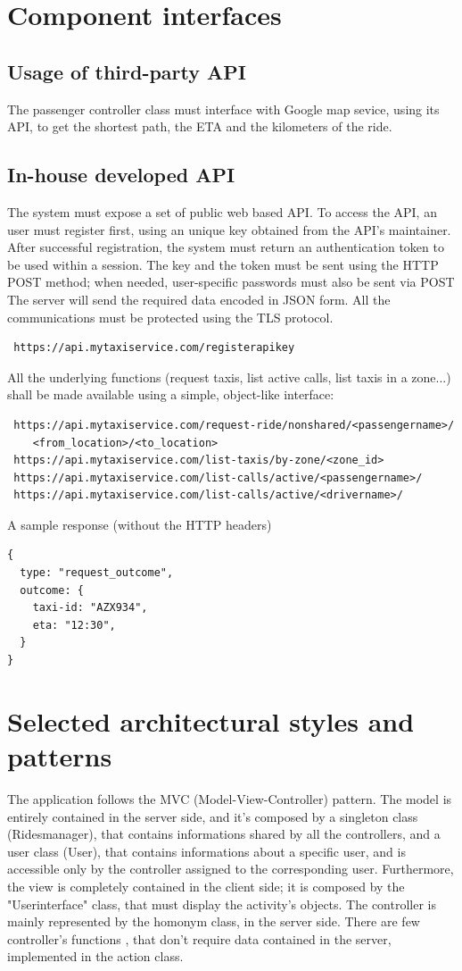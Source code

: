 \section{Component interfaces}

\subsection{Usage of third-party API}
The passenger controller class must interface with Google map sevice, using its API, to get the shortest path, the ETA and the 
kilometers of the ride.

\subsection{In-house developed API}
The system must expose a set of public web based API. To access the API, an user must register first, using an unique key
obtained from the API's maintainer.
After successful registration, the system must return an authentication token to be used within a session.
The key and the token must be sent using the HTTP POST method; when needed, user-specific passwords must also
be sent via POST
The server will send the required data encoded in JSON form.
All the communications must be protected using the TLS protocol.
\begin{verbatim}
 https://api.mytaxiservice.com/registerapikey
\end{verbatim}
All the underlying functions (request taxis, list active calls, list taxis in a zone...) shall be made available using a simple,
object-like interface:
\begin{verbatim}
 https://api.mytaxiservice.com/request-ride/nonshared/<passengername>/
    <from_location>/<to_location>
 https://api.mytaxiservice.com/list-taxis/by-zone/<zone_id>
 https://api.mytaxiservice.com/list-calls/active/<passengername>/
 https://api.mytaxiservice.com/list-calls/active/<drivername>/
\end{verbatim}
A sample response (without the HTTP headers)
\begin{verbatim}
{
  type: "request_outcome",
  outcome: {
    taxi-id: "AZX934",
    eta: "12:30",
  }
}
\end{verbatim}

\section{Selected architectural styles and patterns}
The application follows the MVC (Model-View-Controller) pattern.
The model is entirely contained in the server side, and it's composed by a singleton class (Ridesmanager), that contains 
informations shared by all the controllers, and a user class (User), that contains informations about a specific user, and is
accessible only by the controller assigned to the corresponding user.
Furthermore, the view is completely contained in the client side; it is composed by the "Userinterface" class, that must display
the activity's objects.
The controller is mainly represented by the homonym class, in the server side. There are few controller's functions , that don't 
require data contained in the server, implemented in the action class.

